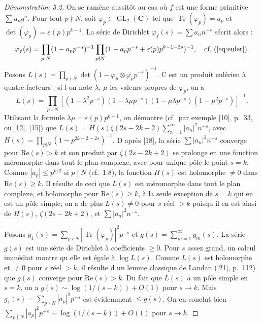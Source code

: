 \documentclass[11pt]{amsart}
\theoremstyle{plain}
\theoremstyle{definition}
\theoremstyle{remark}
\DeclareMathOperator{\GL}{GL}
\DeclareMathOperator{\Tr}{Tr}
\newcommand{\C}{\mathbf{C}}
\begin{document}
\begin{proof}[D\'emonstration 5.2]
On se ram\`ene aussit\^ot au cas o\`u $f$ est une forme primitive $\sum a_n q^n$. Pour tout $p \nmid N$, soit $\varphi_p \in \GL_2(\C)$ tel que $\Tr(\varphi_p) = a_p$ et $\det(\varphi_p) = \varepsilon(p) p^{k-1}$. La s\'erie de Dirichlet $\varphi_f(s) = \sum a_n n^{-s}$ s\'ecrit alors :
$$\varphi_f(s) = \prod_{p|N} (1-a_p p^{-s})^{-1} \prod_{p \nmid N} (1-a_p p^{-s} + \varepsilon(p) p^{k-1-2s})^{-1}, \quad \text{cf.~(\ref{eq:euler})}.$$
Posons $L(s) = \prod_{p \nmid N} \det(1 - \varphi_p \otimes \overline{\varphi_p} p^{-s})^{-1}$. C est un produit eul\'erien \`a quatre facteurs : si l on note $\lambda$, $\mu$ les valeurs propres de $\varphi_p$, on a
$$L(s) = \prod_{p \nmid N} [(1-\lambda^2 p^{-s})(1-\lambda\mu p^{-s})(1-\mu\lambda p^{-s})(1-\mu^2 p^{-s})]^{-1}.$$
Utilisant la formule $\lambda\mu = \varepsilon(p) p^{k-1}$, on d\'emontre (cf.~par exemple [10], p.~33, ou [12], [15]) que $L(s) = H(s) \zeta(2s-2k+2) \sum_{n=1}^{\infty} |a_n|^2 n^{-s}$, avec $H(s) = \prod_{p|N} (1-p^{2k-2-2s})^{-1}$. D apr\`es [18], la s\'erie $\sum |a_n|^2 n^{-s}$ converge pour $\mathrm{Re}(s) > k$ et son produit par $\zeta(2s-2k+2)$ se prolonge en une fonction m\'eromorphe dans tout le plan complexe, avec pour unique p\^ole le point $s = k$. Comme $|a_p| \le p^{k/2}$ si $p \mid N$ (cf.~1.8), la fonction $H(s)$ est holomorphe $\ne 0$ dans $\mathrm{Re}(s) \ge k$. Il r\'esulte de ceci que $L(s)$ est m\'eromorphe dans tout le plan complexe, et holomorphe pour $\mathrm{Re}(s) \ge k$, \`a la seule exception de $s = k$ qui en est un p\^ole simple; on a de plus $L(s) \ne 0$ pour $s$ r\'eel $> k$ puisqu il en est ainsi de $H(s)$, $\zeta(2s-2k+2)$, et $\sum |a_n|^2 n^{-s}$.

Posons $g_1(s) = \sum_{p \nmid N} |\Tr(\varphi_p)|^2 p^{-s}$ et $g(s) = \sum_{m=1}^{\infty} g_m(s)$. La s\'erie $g(s)$ est une s\'erie de Dirichlet \`a coefficients $\ge 0$. Pour $s$ assez grand, un calcul imm\'ediat montre qu elle est \'egale \`a $\log L(s)$. Comme $L(s)$ est holomorphe et $\ne 0$ pour $s$ r\'eel $> k$, il r\'esulte d un lemme classique de Landau ([21], p.~112) que $g(s)$ converge pour $\mathrm{Re}(s) > k$. Du fait que $L(s)$ a un p\^ole simple en $s = k$, on a $g(s) \sim \log(1/(s-k)) + O(1)$ pour $s \to k$. Mais $g_1(s) = \sum_{p \nmid N} |a_p|^2 p^{-s}$ est \'evidemment $\le g(s)$. On en conclut bien $\sum_{p \nmid N} |a_p|^2 p^{-s} \sim \log(1/(s-k)) + O(1)$ pour $s \to k$.
\end{proof}
\end{document}
